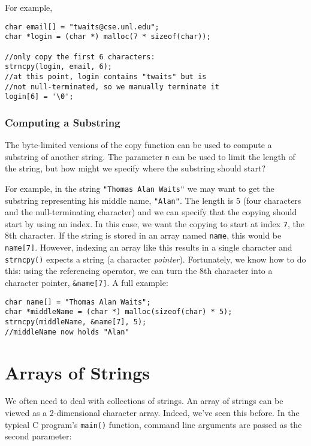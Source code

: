 For example, 

\begin{verbatim}
char email[] = "twaits@cse.unl.edu";
char *login = (char *) malloc(7 * sizeof(char));

//only copy the first 6 characters:
strncpy(login, email, 6);
//at this point, login contains "twaits" but is
//not null-terminated, so we manually terminate it
login[6] = '\0';
\end{verbatim}

\subsubsection{Computing a Substring}

The byte-limited versions of the copy function can
be used to compute a substring of another string.
The parameter \texttt{n} can be used to limit
the length of the string, but how might we specify
where the substring should start?  

For example, in the string \texttt{"Thomas Alan Waits"}
we may want to get the substring representing his
middle name, \texttt{"Alan"}.  The length
is 5 (four characters and the null-terminating character) 
and we can specify that the copying should start by 
using an index.  In this case, we want the copying to
start at index \texttt{7}, the 8th character.  
If the string is stored in an array named \texttt{name}, 
this would be \texttt{name[7]}.  However, indexing
an array like this results in a single character and
\texttt{strncpy()} expects a string (a 
character \emph{pointer}).  Fortunately, we know how
to do this: using the referencing operator, we can
turn the 8th character into a character pointer, 
\texttt{&name[7]}.  A full example:

\begin{verbatim}
char name[] = "Thomas Alan Waits";
char *middleName = (char *) malloc(sizeof(char) * 5);
strncpy(middleName, &name[7], 5);
//middleName now holds "Alan"
\end{verbatim}

\section{Arrays of Strings}

We often need to deal with collections of strings.  An
array of strings can be viewed as a 2-dimensional 
character array.  Indeed, we've seen this before.  In
the typical C program's \texttt{main()} function, 
command line arguments are passed as the second
parameter:

